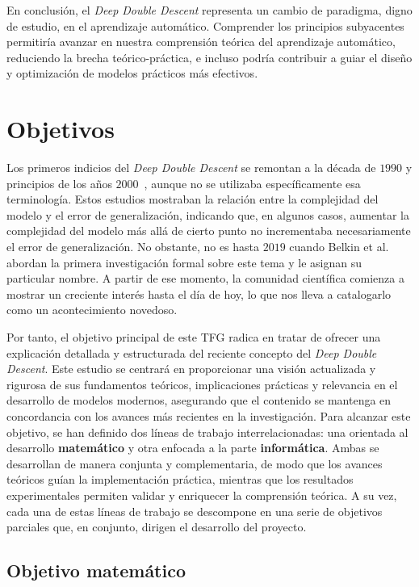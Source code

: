En conclusión, el \emph{Deep Double Descent} representa un cambio de paradigma, digno de estudio, en el aprendizaje automático. Comprender los principios subyacentes permitiría avanzar en nuestra comprensión teórica del aprendizaje automático, reduciendo la brecha teórico-práctica, e incluso podría contribuir a guiar el diseño y optimización de modelos prácticos más efectivos.

\section{Objetivos}

Los primeros indicios del \textit{Deep Double Descent} se remontan a la década de $1990$ y principios de los años $2000$~\cite{Vallet1989, Opper2001}, aunque no se utilizaba específicamente esa terminología. Estos estudios mostraban la relación entre la complejidad del modelo y el error de generalización, indicando que, en algunos casos, aumentar la complejidad del modelo más allá de cierto punto no incrementaba necesariamente el error de generalización. No obstante, no es hasta $2019$ cuando Belkin et al.~\cite{Belkin2019} abordan la primera investigación formal sobre este tema y le asignan su particular nombre. A partir de ese momento, la comunidad científica comienza a mostrar un creciente interés hasta el día de hoy, lo que nos lleva a catalogarlo como un acontecimiento novedoso.

Por tanto, el objetivo principal de este TFG radica en tratar de ofrecer una explicación detallada y estructurada del reciente concepto del \emph{Deep Double Descent}. Este estudio se centrará en proporcionar una visión actualizada y rigurosa de sus fundamentos teóricos, implicaciones prácticas y relevancia en el desarrollo de modelos modernos, asegurando que el contenido se mantenga en concordancia con los avances más recientes en la investigación. Para alcanzar este objetivo, se han definido dos líneas de trabajo interrelacionadas: una orientada al desarrollo \textbf{matemático} y otra enfocada a la parte \textbf{informática}. Ambas se desarrollan de manera conjunta y complementaria, de modo que los avances teóricos guían la implementación práctica, mientras que los resultados experimentales permiten validar y enriquecer la comprensión teórica. A su vez, cada una de estas líneas de trabajo se descompone en una serie de objetivos parciales que, en conjunto, dirigen el desarrollo del proyecto.

\subsection{Objetivo matemático}

